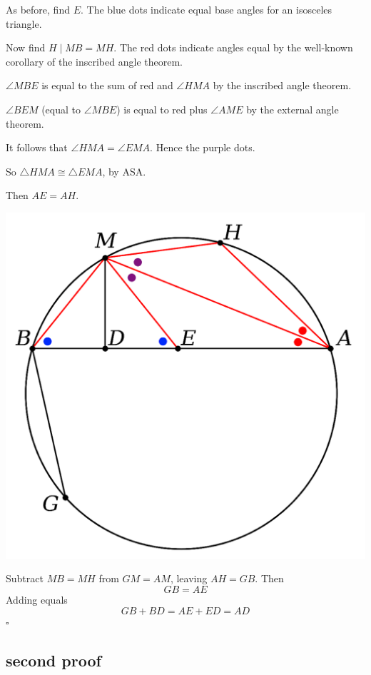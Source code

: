 \documentclass[11pt, oneside]{article}
\begin{document}
As before, find $E$.  The blue dots indicate equal base angles for an isosceles triangle.

Now find $H \mid MB = MH$.  The red dots indicate angles equal by the well-known corollary of the inscribed angle theorem.

$\angle MBE$ is equal to the sum of red and $\angle HMA$ by the inscribed angle theorem.  

$\angle BEM$ (equal to $\angle MBE$) is equal to red plus $\angle AME$ by the external angle theorem.  

It follows that $\angle HMA = \angle EMA$.  Hence the purple dots.

So $\triangle HMA \cong \triangle EMA$, by ASA.

Then $AE = AH$.  

\begin{center} \includegraphics [scale=0.40] {bc1.png} \end{center}

Subtract $MB = MH$ from $GM = AM$, leaving $AH = GB$.  Then
\[ GB = AE \]
Adding equals
\[ GB + BD = AE + ED = AD \]
$\square$

\subsection*{second proof}
\end{document}
